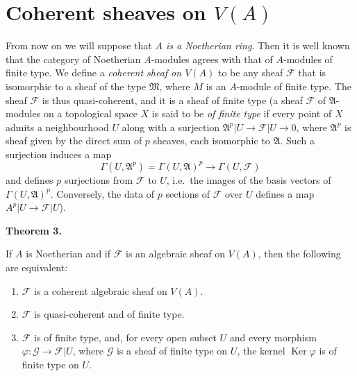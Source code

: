 \documentclass[british]{article}
\providecommand{\tightlist}{%
\setlength{\itemsep}{0pt}\setlength{\parskip}{0pt}}
\newenvironment{itenv}[1]
  {\phantomsection\par\smallskip\noindent\textbf{#1.}\itshape}
  {\par\smallskip}
\newcommand{\oldpage}[1]{\marginpar{\footnotesize$\Big\vert$ \textit{p.~#1}}}
\begin{document}
\section{\texorpdfstring{Coherent sheaves on
\(V(A)\)}{Coherent sheaves on V(A)}}\label{section-4}

From now on we will suppose that \emph{\(A\) is a Noetherian ring}.
\oldpage{1-09} Then it is well known that the category of Noetherian
\(A\)-modules agrees with that of \(A\)-modules of finite type. We
define a \emph{coherent sheaf on \(V(A)\)} to be any sheaf
\({\mathscr{F}}\) that is isomorphic to a sheaf of the type
\(\mathfrak{M}\), where \(M\) is an \(A\)-module of finite type. The
sheaf \({\mathscr{F}}\) is thus quasi-coherent, and it is a sheaf of
finite type (a sheaf \({\mathscr{F}}\) of \(\mathfrak{A}\)-modules on a
topological space \(X\) is said to be \emph{of finite type} if every
point of \(X\) admits a neighbourhood \(U\) along with a surjection
\(\mathfrak{A}^p|U\to{\mathscr{F}}|U\to0\), where \(\mathfrak{A}^p\) is
sheaf given by the direct sum of \(p\) sheaves, each isomorphic to
\(\mathfrak{A}\). Such a surjection induces a map \[
  \Gamma(U,\mathfrak{A}^p) = \Gamma(U,\mathfrak{A})^p \to \Gamma(U,{\mathscr{F}})
\] and defines \(p\) surjections from \({\mathscr{F}}\) to \(U\),
i.e.~the images of the basis vectors of \(\Gamma(U,\mathfrak{A})^p\).
Conversely, the data of \(p\) sections of \({\mathscr{F}}\) over \(U\)
defines a map \(A^p|U\to{\mathscr{F}}|U\)).

\protect{}\label{theorem-3}
\begin{itenv}{Theorem 3}

If \(A\) is Noetherian and if \({\mathscr{F}}\) is an algebraic sheaf on
\(V(A)\), then the following are equivalent:

\begin{enumerate}
\def\labelenumi{\alph{enumi}.}
\tightlist
\item
  \({\mathscr{F}}\) is a coherent algebraic sheaf on \(V(A)\).
\item
  \({\mathscr{F}}\) is quasi-coherent and of finite type.
\item
  \({\mathscr{F}}\) is of finite type, and, for every open subset \(U\)
  and every morphism \(\varphi\colon{\mathscr{G}}\to{\mathscr{F}}|U\),
  where \({\mathscr{G}}\) is a sheaf of finite type on \(U\), the kernel
  \(\operatorname{Ker}\varphi\) is of finite type on \(U\).
\end{enumerate}

\end{itenv}
\end{document}
